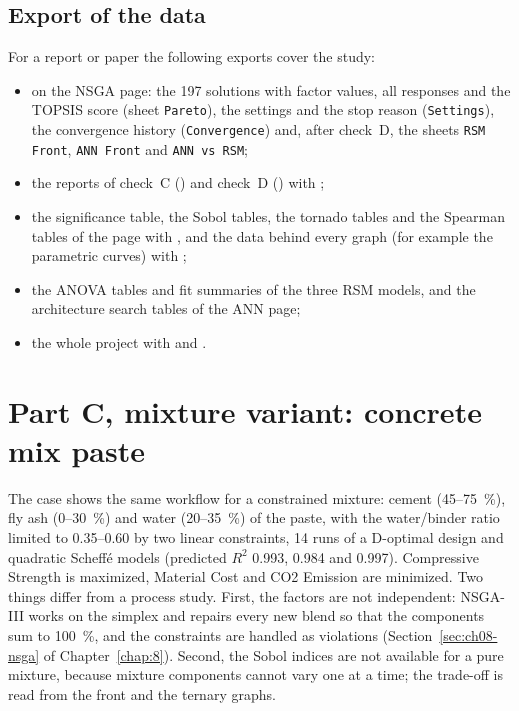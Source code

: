 \subsection{Export of the data}
For a report or paper the following exports cover the study:
\begin{itemize}
  \item {} on the NSGA page: the 197 solutions with factor values, all responses and the
        TOPSIS score (sheet \texttt{Pareto}), the settings and the stop reason (\texttt{Settings}), the convergence
        history (\texttt{Convergence}) and, after check~D, the sheets \texttt{RSM Front}, \texttt{ANN Front} and
        \texttt{ANN vs RSM};
  \item the reports of check~C () and check~D () with ;
  \item the significance table, the Sobol tables, the tornado tables and the Spearman tables of the
         page with , and the data behind every graph (for example the
        parametric curves) with ;
  \item the ANOVA tables and fit summaries of the three RSM models, and the architecture search tables of the ANN
        page;
  \item the whole project with  and .
\end{itemize}

\section{Part C, mixture variant: concrete mix paste}
\label{sec:ch11-concrete}
The case  shows the same workflow for a constrained mixture: cement
(45--75~\%), fly ash (0--30~\%) and water (20--35~\%) of the paste, with the water/binder ratio limited to 0.35--0.60
by two linear constraints, 14 runs of a D-optimal design and quadratic Scheff\'e models (predicted $R^2$ 0.993, 0.984
and 0.997). Compressive Strength is maximized, Material Cost and CO2 Emission are minimized. Two things differ from a
process study. First, the factors are not independent: NSGA-III works on the simplex and repairs every new blend so
that the components sum to 100~\%, and the constraints are handled as violations
(Section~\ref{sec:ch08-nsga} of Chapter~\ref{chap:8}). Second, the Sobol indices are not available for a pure mixture,
because mixture components cannot vary one at a time; the trade-off is read from the front and the ternary graphs.


